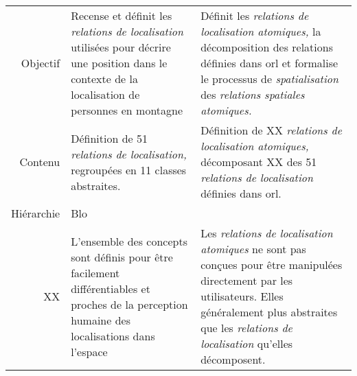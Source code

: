 \begin{tabular}{r>{\small}p{}>{\small}p{}}
  \toprule & \multicolumn{1}{c}{\ac{orl}} &
  \multicolumn{1}{c}{\ac{orla}} \\ \midrule
  \addlinespace
  Objectif & Recense et définit les \emph{relations de localisation} utilisées
  pour décrire une position dans le contexte de la localisation de
  personnes en montagne & Définit les \emph{relations de localisation
                          atomiques,} la décomposition des relations
  définies dans \ac{orl} et formalise le processus de
                          \emph{spatialisation} des \emph{relations
                          spatiales atomiques.}\\
  Contenu & Définition de 51 \emph{relations de localisation,}
            regroupées en 11 classes abstraites. & Définition de XX
                                                   \emph{relations de
                                                   localisation
                                                   atomiques,}
                                                   décomposant XX des
                                                   51 \emph{relations
                                                   de localisation}
                                                   définies dans \ac{orl}.\\
  Hiérarchie & Blo & \\
  XX & L'ensemble des concepts sont définis pour être facilement
       différentiables et proches de la perception humaine des
       localisations dans l'espace & Les \emph{relations de
                                     localisation atomiques} ne sont
                                     pas conçues pour être manipulées
                                     directement par les utilisateurs.
  Elles généralement plus abstraites que les \emph{relations de
                                     localisation} qu'elles
                                     décomposent.\\ 
  \bottomrule
\end{tabular}
